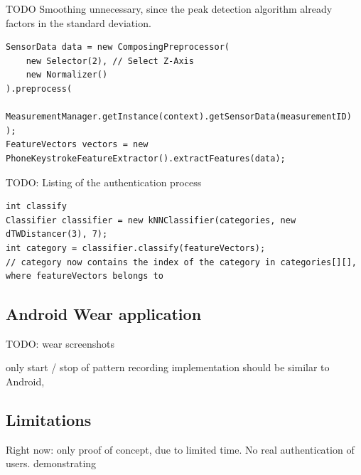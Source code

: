 TODO Smoothing unnecessary, since the peak detection algorithm already factors in the standard deviation.

\begin{lstlisting}[float,
caption={Minimum working example to extract keystroke features},
label={lst:keystrokefeatures}]
SensorData data = new ComposingPreprocessor(
    new Selector(2), // Select Z-Axis
    new Normalizer()
).preprocess(
    MeasurementManager.getInstance(context).getSensorData(measurementID)
);
FeatureVectors vectors = new PhoneKeystrokeFeatureExtractor().extractFeatures(data);
\end{lstlisting}

TODO: Listing of the authentication process

\begin{lstlisting}[float,
caption={Minimum working example to classify a given FeatureVectors according to previously learened categories},
label={lst:authenticationprocess}]
int classify
Classifier classifier = new kNNClassifier(categories, new dTWDistancer(3), 7);
int category = classifier.classify(featureVectors);
// category now contains the index of the category in categories[][], where featureVectors belongs to
\end{lstlisting}

\subsection{Android Wear application}
TODO: wear screenshots

only start / stop of pattern recording
implementation should be similar to Android, 

\subsection{Limitations}

Right now: only proof of concept, due to limited time. No real authentication of users. demonstrating 
